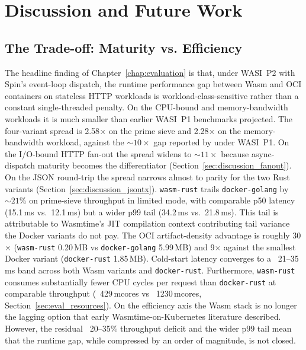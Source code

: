 \chapter{Discussion and Future Work}
\label{chap:discussion}

\section{The Trade-off: Maturity vs. Efficiency}
\label{sec:discussion_tradeoff}

\begin{sloppypar}
The headline finding of Chapter~\ref{chap:evaluation} is that, under \acs{WASI}~P2 with Spin's event-loop dispatch, the runtime performance gap between \acs{Wasm} and \acs{OCI} containers on stateless \acs{HTTP} workloads is workload-class-sensitive rather than a constant single-threaded penalty. On the \acs{CPU}-bound and memory-bandwidth workloads it is much smaller than earlier \acs{WASI}~P1 benchmarks projected. The four-variant spread is 2.58$\times$ on the prime sieve and 2.28$\times$ on the memory-bandwidth workload, against the ${\sim}10\times$ gap reported by \textcite{sondell2024performance} under \acs{WASI}~P1. On the I/O-bound HTTP fan-out the spread widens to ${\sim}11\times$ because async-dispatch maturity becomes the differentiator (Section~\ref{sec:discussion_fanout}). On the \acs{JSON} round-trip the spread narrows almost to parity for the two Rust variants (Section~\ref{sec:discussion_jsontx}). \texttt{wasm-rust} trails \texttt{docker-golang} by ${\sim}21$\% on prime-sieve throughput in limited mode, with comparable p50 latency (15.1\,ms vs.\ 12.1\,ms) but a wider p99 tail (34.2\,ms vs.\ 21.8\,ms). This tail is attributable to Wasmtime's \acs{JIT} compilation context contributing tail variance the Docker variants do not pay. The \acs{OCI} artifact-density advantage is roughly 30$\times$ (\texttt{wasm-rust} 0.20\,MB vs \texttt{docker-golang} 5.99\,MB) and 9$\times$ against the smallest Docker variant (\texttt{docker-rust} 1.85\,MB). Cold-start latency converges to a ~21--35\,ms band across both \acs{Wasm} variants and \texttt{docker-rust}. Furthermore, \texttt{wasm-rust} consumes substantially fewer \acs{CPU} cycles per request than \texttt{docker-rust} at comparable throughput (~429\,mcores vs ~1230\,mcores, Section~\ref{sec:eval_resources}). On the efficiency axis the \acs{Wasm} stack is no longer the lagging option that early Wasmtime-on-Kubernetes literature described. However, the residual ~20--35\% throughput deficit and the wider p99 tail mean that the runtime gap, while compressed by an order of magnitude, is not closed.
\end{sloppypar}

